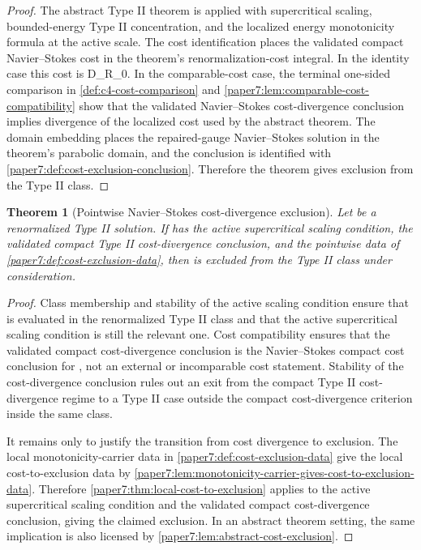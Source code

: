 \documentclass[11pt]{amsart}
\def\({}%
\def\){}%
\def\tilde#1{#1}%
\def\mathfrak#1{#1}%
\theoremstyle{plain}
\newtheorem{theorem}{Theorem}[section]
\theoremstyle{definition}
\theoremstyle{remark}
\begin{document}
\begin{proof}
The abstract Type II theorem is applied with supercritical scaling,
bounded-energy Type II concentration, and the localized energy monotonicity
formula at the active scale.  The cost identification places the validated
compact Navier--Stokes cost in the theorem's renormalization-cost integral.  In
the identity case this cost is \(\tilde{\mathfrak D}_{R_0}\).  In the
comparable-cost case, the terminal one-sided comparison in
\cref{def:c4-cost-comparison} and
\cref{paper7:lem:comparable-cost-compatibility} show that the validated
Navier--Stokes cost-divergence conclusion implies divergence of the localized
cost used by the abstract theorem.  The domain embedding places the
repaired-gauge Navier--Stokes solution in the theorem's parabolic domain, and
the conclusion is identified with \cref{paper7:def:cost-exclusion-conclusion}.
Therefore the theorem gives exclusion from the Type II class.
\end{proof}

\begin{theorem}[Pointwise Navier--Stokes cost-divergence exclusion]
\label{paper7:thm:pointwise-cost-exclusion}
Let \(\omega\) be a renormalized Type II solution.  If \(\omega\) has the
active supercritical scaling condition, the validated compact Type II
cost-divergence conclusion, and the pointwise data of
\cref{paper7:def:cost-exclusion-data}, then \(\omega\) is excluded from the
Type II class under consideration.
\end{theorem}

\begin{proof}
Class membership and stability of the active scaling condition ensure that
\(\omega\) is evaluated in the renormalized Type II class and that the active
supercritical scaling condition is still the relevant one.  Cost compatibility
ensures that the validated compact cost-divergence conclusion is the
Navier--Stokes compact cost conclusion for \(\omega\), not an external or
incomparable cost statement.  Stability of the cost-divergence conclusion rules
out an exit from the compact Type II cost-divergence regime to a Type II case
outside the compact cost-divergence criterion inside the same class.
\par
It remains only to justify the transition from cost divergence to exclusion.
The local monotonicity-carrier data in \cref{paper7:def:cost-exclusion-data}
give the local cost-to-exclusion data by
\cref{paper7:lem:monotonicity-carrier-gives-cost-to-exclusion-data}.
Therefore
\cref{paper7:thm:local-cost-to-exclusion} applies to the active supercritical
scaling condition and the validated compact cost-divergence conclusion, giving
the claimed exclusion.  In an abstract theorem setting, the same implication is
also licensed by \cref{paper7:lem:abstract-cost-exclusion}.
\end{proof}
\end{document}
